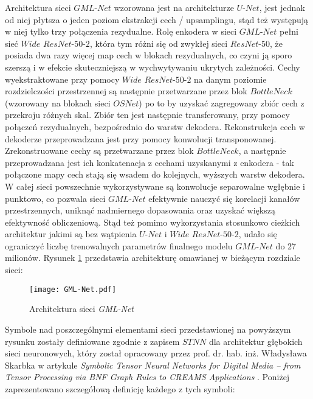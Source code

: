 \cell
Architektura sieci $\textit{GML-Net}$ wzorowana jest na architekturze $\textit{U-Net}$, jest jednak od niej płytsza o jeden poziom ekstrakcji cech / upsamplingu, stąd też występują w niej tylko trzy połączenia rezydualne. Rolę enkodera w sieci $\textit{GML-Net}$ pełni sieć $\textit{Wide ResNet-50-2}$, która tym różni się od zwykłej sieci $\textit{ResNet-50}$, że posiada dwa razy więcej map cech w blokach rezydualnych, co czyni ją sporo szerszą i w efekcie skuteczniejszą w wychwytywaniu ukrytych zależności. Cechy wyekstraktowane przy pomocy $\textit{Wide ResNet-50-2}$ na danym poziomie rozdzielczości przestrzennej są następnie przetwarzane przez blok $\textit{BottleNeck}$ (wzorowany na blokach sieci $\textit{OSNet}$) po to by uzyskać zagregowany zbiór cech z przekroju różnych skal. Zbiór ten jest następnie transferowany, przy pomocy połączeń rezydualnych, bezpośrednio do warstw dekodera. Rekonstrukcja cech w dekoderze przeprowadzana jest przy pomocy konwolucji transponowanej. Zrekonstruowane cechy są przetwarzane przez blok $\textit{BottleNeck}$, a następnie przeprowadzana jest ich konkatenacja z cechami uzyskanymi z enkodera - tak połączone mapy cech stają się wsadem do kolejnych, wyższych warstw dekodera. W całej sieci powszechnie wykorzystywane są konwolucje separowalne wgłębnie i punktowo, co pozwala sieci $\textit{GML-Net}$ efektywnie nauczyć się korelacji kanałów przestrzennych, uniknąć nadmiernego dopasowania oraz uzyskać większą efektywność obliczeniową. Stąd też pomimo wykorzystania stosunkowo cieżkich architektur jakimi są bez wątpienia $\textit{U-Net}$ i $\textit{Wide ResNet-50-2}$, udało się ograniczyć liczbę trenowalnych parametrów finalnego modelu $\textit{GML-Net}$ do 27 milionów. Rysunek \ref{fig:gmlnet1} przedstawia architekturę omawianej w bieżącym rozdziale sieci:

\begin{figure}[!h]
    \centering \texttt{[image: GML-Net.pdf]}
    \captionsetup{format=hang}
    \caption{Architektura sieci \textit{GML-Net}}
    \label{fig:gmlnet1}
\end{figure}

Symbole nad poszczególnymi elementami sieci przedstawionej na powyższym rysunku zostały definiowane zgodnie z zapisem $\textit{STNN}$ dla architektur głębokich sieci neuronowych, który został opracowany przez prof. dr. hab. inż. Władysława Skarbka w artykule \textit{Symbolic Tensor Neural Networks for Digital Media – from Tensor Processing via BNF Graph Rules to CREAMS Applications} \cite{skarbek}. Poniżej zaprezentowano szczegółową definicję każdego z tych symboli:


